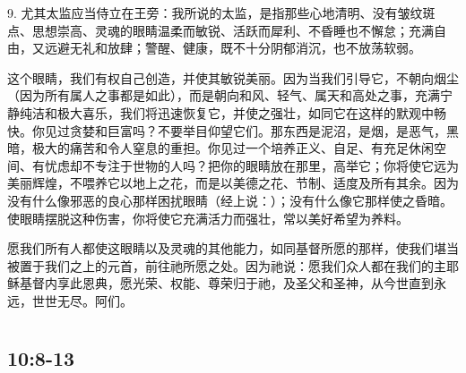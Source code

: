 9. 尤其太监应当侍立在王旁：我所说的太监，是指那些心地清明、没有皱纹斑点、思想崇高、灵魂的眼睛温柔而敏锐、活跃而犀利、不昏睡也不懈怠；充满自由，又远避无礼和放肆；警醒、健康，既不十分阴郁消沉，也不放荡软弱。\par

这个眼睛，我们有权自己创造，并使其敏锐美丽。因为当我们引导它，不朝向烟尘（因为所有属人之事都是如此），而是朝向和风、轻气、属天和高处之事，充满宁静纯洁和极大喜乐，我们将迅速恢复它，并使之强壮，如同它在这样的默观中畅快。你见过贪婪和巨富吗？不要举目仰望它们。那东西是泥沼，是烟，是恶气，黑暗，极大的痛苦和令人窒息的重担。你见过一个培养正义、自足、有充足休闲空间、有忧虑却不专注于世物的人吗？把你的眼睛放在那里，高举它；你将使它远为美丽辉煌，不喂养它以地上之花，而是以美德之花、节制、适度及所有其余。因为没有什么像邪恶的良心那样困扰眼睛（经上说：）；没有什么像它那样使之昏暗。使眼睛摆脱这种伤害，你将使它充满活力而强壮，常以美好希望为养料。\par

愿我们所有人都使这眼睛以及灵魂的其他能力，如同基督所愿的那样，使我们堪当被置于我们之上的元首，前往祂所愿之处。因为祂说：愿我们众人都在我们的主耶稣基督内享此恩典，愿光荣、权能、尊荣归于祂，及圣父和圣神，从今世直到永远，世世无尽。阿们。\par



\section{}


\subsection{ 10:8-13}

\par

